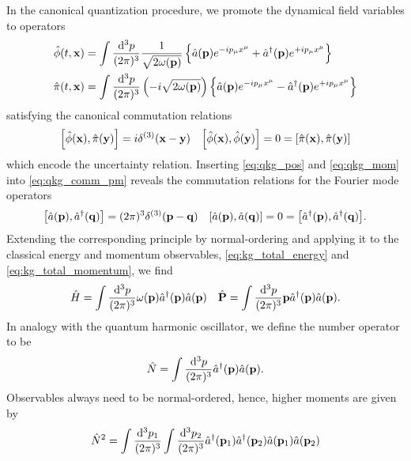 In the canonical quantization procedure, we promote the dynamical field variables to operators
\begin{align}
	\hat\phi(t,\vb{x})
	&=
	\int\frac{\dd[3]{p}}{(2\pi)^3}
	\frac{1}{\sqrt{2\omega(\vb{p})}}
	\left\{
		\hat{a}(\vb{p})
		e^{-ip_\mu x^\mu}
		+
		\hat{a}^\dagger(\vb{p})
		e^{+ip_\mu x^\mu}
	\right\}
	\label{eq:qkg_pos}
	\\
	\hat\pi(t,\vb{x})
	&=
	\int\frac{\dd[3]{p}}{(2\pi)^3}
	\left(-i\sqrt{2\omega(\vb{p})}\right)
	\left\{
		\hat{a}(\vb{p})
		e^{-ip_\mu x^\mu}
		-
		\hat{a}^\dagger(\vb{p})
		e^{+ip_\mu x^\mu}
	\right\}
	\label{eq:qkg_mom}
\end{align}
satisfying the canonical commutation relations
\begin{align}
	\comm{\hat\phi(\vb{x})}{\hat\pi(\vb{y})}
	=
	i\delta^{(3)}(\vb{x}-\vb{y})
	&&
	\comm{\hat\phi(\vb{x})}{\hat\phi(\vb{y})}
	=
	0
	=
	\comm{\hat\pi(\vb{x})}{\hat\pi(\vb{y})}
	\label{eq:qkg_comm_pm}	
\end{align}
which encode the uncertainty relation.
Inserting \cref{eq:qkg_pos} and \cref{eq:qkg_mom} into \cref{eq:qkg_comm_pm} reveals the commutation relations for the Fourier mode operators
\begin{align}
	\comm{\hat{a}(\vb{p})}{\hat{a}^\dagger(\vb{q})}
	=
	(2\pi)^3\delta^{(3)}(\vb{p}-\vb{q})
	&&
	\comm{\hat{a}(\vb{p})}{\hat{a}(\vb{q})}
	=
	0
	=
	\comm{\hat{a}^\dagger(\vb{p})}{\hat{a}^\dagger(\vb{q})}
	\label{eq:kg_comm_ac}.
\end{align}
Extending the corresponding principle by normal-ordering and applying it to the classical energy and momentum observables, \cref{eq:kg_total_energy} and \cref{eq:kg_total_momentum}, we find
\begin{align}
	\hat{H}
	=
	\int\frac{\dd[3]{p}}{(2\pi)^3}
	\omega(\vb{p})\hat{a}^\dagger(\vb{p})\hat{a}(\vb{p})
	&&
	\hat{\vb{P}}
	=
	\int\frac{\dd[3]{p}}{(2\pi)^3}
	\vb{p}\hat{a}^\dagger(\vb{p})\hat{a}(\vb{p})
	\label{eq:qkg_total_energy_momentum}.
\end{align}
In analogy with the quantum harmonic oscillator, we define the number operator to be
\begin{equation}
	\hat{N}
	=
	\int\frac{\dd[3]{p}}{(2\pi)^3}
	\hat{a}^\dagger(\vb{p})
	\hat{a}(\vb{p})
	\label{eq:qkg_number}.
\end{equation}
Observables always need to be normal-ordered, hence, higher moments are given by
\begin{equation}
	\hat{N}^2
	=
	\int\frac{\dd[3]{p_1}}{(2\pi)^3}
	\int\frac{\dd[3]{p_2}}{(2\pi)^3}
	\hat{a}^\dagger(\vb{p}_1)
	\hat{a}^\dagger(\vb{p}_2)
	\hat{a}(\vb{p}_1)
	\hat{a}(\vb{p}_2)
\end{equation}

